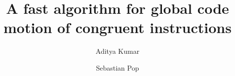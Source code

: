 \documentclass[sigplan,10pt,review,anonymous]{acmart}\settopmatter{printfolios=true,printccs=false,printacmref=false}
\begin{document}
\title[SSA GCM]{A fast algorithm for global code motion of congruent instructions}         %

\def \GCC {GCC}
\def \LLVM {LLVM}
\def \CFG {CFG}
\def \SSA {SSA}
\def \MemorySSA {MemorySSA}
\def \PRE {PRE}
\def \GVN {GVN}
\def \SPEC {SPEC CPU 2006}
\def \gcm {global-code-motion}
\def \GCM {GCM}
\def \xlinux {x86\_64-linux}
\def \ooo {out-of-order}


\author{Aditya Kumar}

\author{Sebastian Pop}
\end{document}
